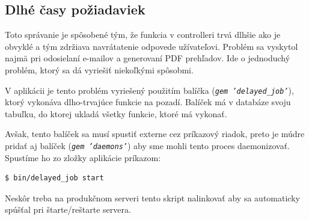 \subsection{Dlhé časy požiadaviek}

Toto správanie je spôsobené tým, že funkcia v controlleri trvá dlhšie ako je obvyklé a tým zdržiava navrátatenie odpovede užívateľovi.
Problém sa vyskytol najmä pri odosielaní e-mailov a generovaní PDF prehľadov. Ide o jednoduchý problém, ktorý sa dá vyriešiť niekoľkými spôsobmi. 

V aplikácii je tento problém vyriešený použitím balíčka (\emph{\texttt{gem 'delayed\_job'}}), ktorý vykonáva dlho-trvajúce funkcie na pozadí. Balíček má v databáze svoju tabuľku, do ktorej ukladá všetky funkcie, ktoré má vykonať. 

Avšak, tento balíček sa musí spustiť externe cez príkazový riadok, preto je múdre pridať aj balíček (\emph{\texttt{gem 'daemons'}}) aby sme mohli tento proces daemonizovať. Spustíme ho zo zložky aplikácie príkazom:

\begin{verbatim}
$ bin/delayed_job start
\end{verbatim}

Neskôr treba na produkčnom serveri tento skript nalinkovať aby sa automaticky spúšťal pri štarte/reštarte servera.